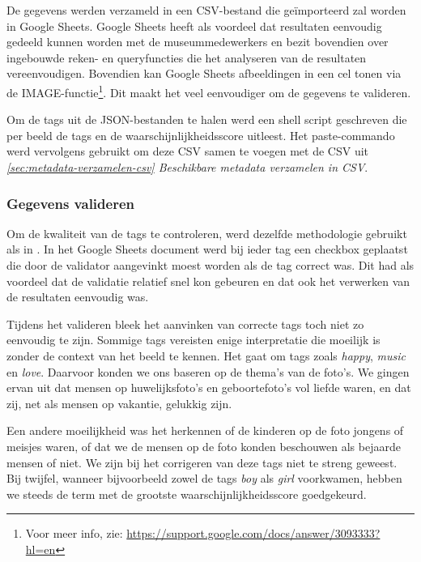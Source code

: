 De gegevens werden verzameld in een CSV-bestand die geïmporteerd zal worden in Google Sheets. Google Sheets heeft als voordeel dat resultaten eenvoudig gedeeld kunnen worden met de museummedewerkers en bezit bovendien over ingebouwde reken- en queryfuncties die het analyseren van de resultaten vereenvoudigen. Bovendien kan Google Sheets afbeeldingen in een cel tonen via de IMAGE-functie\footnote{Voor meer info, zie: \url{https://support.google.com/docs/answer/3093333?hl=en}}. Dit maakt het veel eenvoudiger om de gegevens te valideren.

Om de tags uit de JSON-bestanden te halen werd een shell script geschreven die per beeld de tags en de waarschijnlijkheidsscore uitleest. Het paste-commando werd vervolgens gebruikt om deze CSV samen te voegen met de CSV uit \textit{\ref{sec:metadata-verzamelen-csv} Beschikbare metadata verzamelen in CSV}.


\subsubsection{Gegevens valideren}

Om de kwaliteit van de tags te controleren, werd dezelfde methodologie gebruikt als in \textcite{Vanstappen2019}. In het Google Sheets document werd bij ieder tag een checkbox geplaatst die door de validator aangevinkt moest worden als de tag correct was. Dit had als voordeel dat de validatie relatief snel kon gebeuren en dat ook het verwerken van de resultaten eenvoudig was. 

Tijdens het valideren bleek het aanvinken van correcte tags toch niet zo eenvoudig te zijn. Sommige tags vereisten enige interpretatie die moeilijk is zonder de context van het beeld te kennen. Het gaat om tags zoals \textit{happy}, \textit{music} en \textit{love}. Daarvoor konden we ons baseren op de thema’s van de foto’s. We gingen ervan uit dat mensen op huwelijksfoto’s en geboortefoto’s vol liefde waren, en dat zij, net als mensen op vakantie, gelukkig zijn. 

Een andere moeilijkheid was het herkennen of de kinderen op de foto jongens of meisjes waren, of dat we de mensen op de foto konden beschouwen als bejaarde mensen of niet. We zijn bij het corrigeren van deze tags niet te streng geweest. Bij twijfel, wanneer bijvoorbeeld zowel de tags \textit{boy} als \textit{girl} voorkwamen, hebben we steeds de term met de grootste waarschijnlijkheidsscore goedgekeurd.


